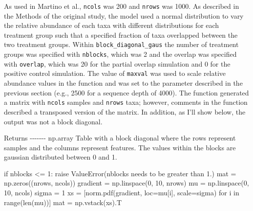 \documentclass[
]{article}
\newenvironment{Shaded}{}{}
\newcommand{\BuiltInTok}[1]{\textcolor[rgb]{0.65,0.15,0.64}{#1}}
\newcommand{\ControlFlowTok}[1]{\textcolor[rgb]{0.65,0.15,0.64}{#1}}
\newcommand{\DecValTok}[1]{\textcolor[rgb]{0.60,0.41,0.00}{#1}}
\newcommand{\FloatTok}[1]{\textcolor[rgb]{0.60,0.41,0.00}{#1}}
\newcommand{\KeywordTok}[1]{\textcolor[rgb]{0.65,0.15,0.64}{#1}}
\newcommand{\NormalTok}[1]{\textcolor[rgb]{0.22,0.23,0.26}{#1}}
\newcommand{\OperatorTok}[1]{\textcolor[rgb]{0.65,0.15,0.64}{#1}}
\newcommand{\PreprocessorTok}[1]{\textcolor[rgb]{0.65,0.15,0.64}{#1}}
\newcommand{\StringTok}[1]{\textcolor[rgb]{0.31,0.63,0.31}{#1}}
\begin{document}
As used in Martino et al., \texttt{ncols} was 200 and \texttt{nrows} was
1000. As described in the Methods of the original study, the model used
a normal distribution to vary the relative abundance of each taxa with
different distributions for each treatment group such that a specified
fraction of taxa overlapped between the two treatment groups. Within
\texttt{block\_diagonal\_gaus} the number of treatment groups was
specified with \texttt{nblocks}, which was 2 and the overlap was
specified with \texttt{overlap}, which was 20 for the partial overlap
simulation and 0 for the positive control simulation. The value of
\texttt{maxval} was used to scale relative abundance values in the
function and was set to the parameter described in the previous section
(e.g., 2500 for a sequence depth of 4000). The function generated a
matrix with \texttt{ncols} samples and \texttt{nrows} taxa; however,
comments in the function described a transposed version of the matrix.
In addition, as I'll show below, the output was not a block diagonal.

\footnotesize

\begin{Shaded}
\begin{Highlighting}[numbers=left,,firstnumber=105,]
\NormalTok{    Returns}
    \OperatorTok{{-}{-}{-}{-}{-}{-}{-}}
\NormalTok{    np.array}
\NormalTok{        Table }\ControlFlowTok{with}\NormalTok{ a block diagonal where the rows represent samples}
        \KeywordTok{and}\NormalTok{ the columns represent features.  The values within the blocks}
\NormalTok{        are gaussian distributed between }\DecValTok{0} \KeywordTok{and} \FloatTok{1.}
\end{Highlighting}
\end{Shaded}

\normalsize{}

\footnotesize

\begin{Shaded}
\begin{Highlighting}[numbers=left,,firstnumber=117,]
    \ControlFlowTok{if}\NormalTok{ nblocks }\OperatorTok{\textless{}=} \DecValTok{1}\NormalTok{:}
        \ControlFlowTok{raise} \PreprocessorTok{ValueError}\NormalTok{(}\StringTok{\textquotesingle{}\textasciigrave{}nblocks\textasciigrave{} needs to be greater than 1.\textquotesingle{}}\NormalTok{)}
\NormalTok{    mat }\OperatorTok{=}\NormalTok{ np.zeros((nrows, ncols))}
\NormalTok{    gradient }\OperatorTok{=}\NormalTok{ np.linspace(}\DecValTok{0}\NormalTok{, }\DecValTok{10}\NormalTok{, nrows)}
\NormalTok{    mu }\OperatorTok{=}\NormalTok{ np.linspace(}\DecValTok{0}\NormalTok{, }\DecValTok{10}\NormalTok{, ncols)}
\NormalTok{    sigma }\OperatorTok{=} \DecValTok{1}
\NormalTok{    xs }\OperatorTok{=}\NormalTok{ [norm.pdf(gradient, loc}\OperatorTok{=}\NormalTok{mu[i], scale}\OperatorTok{=}\NormalTok{sigma)}
          \ControlFlowTok{for}\NormalTok{ i }\KeywordTok{in} \BuiltInTok{range}\NormalTok{(}\BuiltInTok{len}\NormalTok{(mu))]}
\NormalTok{    mat }\OperatorTok{=}\NormalTok{ np.vstack(xs).T}
\end{Highlighting}
\end{Shaded}
\end{document}
